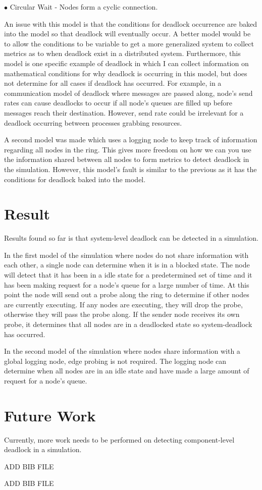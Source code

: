 \documentclass{article}
\begin{document}
$\bullet$ Circular Wait - Nodes form a cyclic connection.\newline

An issue with this model is that the conditions for deadlock occurrence are baked into the model so that deadlock will eventually occur. A better model would be to allow the conditions to be variable to get a more generalized system to collect metrics as to when deadlock exist in a distributed system. Furthermore, this model is one specific example of deadlock in which I can collect information on mathematical conditions for why deadlock is occurring in this model, but does not determine for all cases if deadlock has occurred. For example, in a communication model of deadlock where messages are passed along, node's send rates can cause deadlocks to occur if all node's queues are filled up before messages reach their destination. However, send rate could be irrelevant for a deadlock occurring between processes grabbing resources. 

A second model was made which uses a logging node to keep track of information regarding all nodes in the ring. This gives more freedom on how we can you use the information shared between all nodes to form metrics to detect deadlock in the simulation. However, this model's fault is similar to the previous as it has the conditions for deadlock baked into the model.

\section{Result} %

Results found so far is that system-level deadlock can be detected in a simulation. 

In the first model of the simulation where nodes do not share information with each other, a single node can determine when it is in a blocked state. The node will detect that it has been in a idle state for a predetermined set of time and it has been making request for a node's queue for a large number of time. At this point the node will send out a probe along the ring to determine if other nodes are currently executing. If any nodes are executing, they will drop the probe, otherwise they will pass the probe along. If the sender node receives its own probe, it determines that all nodes are in a deadlocked state so system-deadlock has occurred.

In the second model of the simulation where nodes share information with a global logging node, edge probing is not required. The logging node can determine when all nodes are in an idle state and have made a large amount of request for a node's queue.

\section{Future Work}
Currently, more work needs to be performed on detecting component-level deadlock in a simulation.

\begin{thebibliography}{9}
ADD BIB FILE


ADD BIB FILE
\end{thebibliography}
\end{document}
